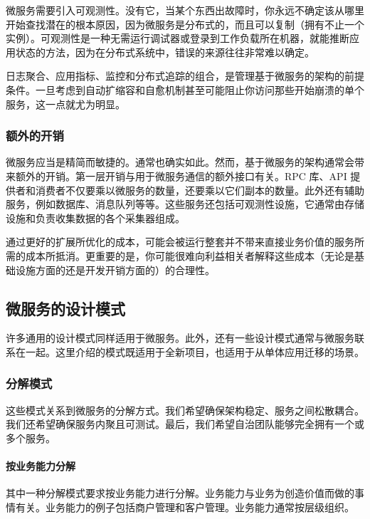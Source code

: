 \label{idx:1405}
微服务需要引入可观测性。没有它，当某个东西出故障时，你永远不确定该从哪里开始查找潜在的根本原因，因为微服务是分布式的，而且可以复制（拥有不止一个实例）。可观测性是一种无需运行调试器或登录到工作负载所在机器，就能推断应用状态的方法，因为在分布式系统中，错误的来源往往非常难以确定。

日志聚合、应用指标、监控和分布式追踪的组合，是管理基于微服务的架构的前提条件。一旦考虑到自动扩缩容和自愈机制甚至可能阻止你访问那些开始崩溃的单个服务，这一点就尤为明显。

\subsubsection{额外的开销}

\label{idx:1406}
微服务应当是精简而敏捷的。通常也确实如此。然而，基于微服务的架构通常会带来额外的开销。第一层开销与用于微服务通信的额外接口有关。RPC 库、API 提供者和消费者不仅要乘以微服务的数量，还要乘以它们副本的数量。此外还有辅助服务，例如数据库、消息队列等等。这些服务还包括可观测性设施，它通常由存储设施和负责收集数据的各个采集器组成。

\label{idx:1407}
通过更好的扩展所优化的成本，可能会被运行整套并不带来直接业务价值的服务所需的成本所抵消。更重要的是，你可能很难向利益相关者解释这些成本（无论是基础设施方面的还是开发开销方面的）的合理性。

\subsection{微服务的设计模式}

\label{idx:1408}
许多通用的设计模式同样适用于微服务。此外，还有一些设计模式通常与微服务联系在一起。这里介绍的模式既适用于全新项目，也适用于从单体应用迁移的场景。

\subsubsection{分解模式}

\label{idx:1409}
这些模式关系到微服务的分解方式。我们希望确保架构稳定、服务之间松散耦合。我们还希望确保服务内聚且可测试。最后，我们希望自治团队能够完全拥有一个或多个服务。

\paragraph{按业务能力分解}

其中一种分解模式要求按业务能力进行分解。业务能力与业务为创造价值而做的事情有关。业务能力的例子包括商户管理和客户管理。业务能力通常按层级组织。

